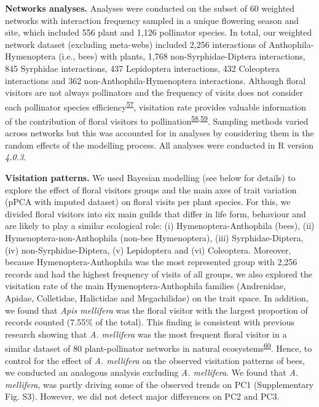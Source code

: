 \documentclass[12pt,a4paper,]{article}
\begin{document}
\textbf{Networks analyses.} Analyses were conducted on the subset of 60
weighted networks with interaction frequency sampled in a unique
flowering season and site, which included 556 plant and 1,126 pollinator
species. In total, our weighted network dataset (excluding meta-webs)
included 2,256 interactions of Anthophila-Hymenoptera (i.e., bees) with
plants, 1,768 non-Syrphidae-Diptera interactions, 845 Syrphidae
interactions, 437 Lepidoptera interactions, 432 Coleoptera interactions
and 362 non-Anthophila-Hymenoptera interactions. Although floral
visitors are not always pollinators and the frequency of visits does not
consider each pollinator species
efficiency\textsuperscript{\protect\hyperlink{ref-ballantyne2015}{57}},
visitation rate provides valuable information of the contribution of
floral visitors to
pollination\textsuperscript{\protect\hyperlink{ref-vazquez2005}{58},\protect\hyperlink{ref-vazquez2012}{59}}.
Sampling methods varied across networks but this was accounted for in
analyses by considering them in the random effects of the modelling
process. All analyses were conducted in R version \emph{4.0.3}.

\textbf{Visitation patterns.} We used Bayesian modelling (see below for
details) to explore the effect of floral visitors groups and the main
axes of trait variation (pPCA with imputed dataset) on floral visits per
plant species. For this, we divided floral visitors into six main guilds
that differ in life form, behaviour and are likely to play a similar
ecological role: (i) Hymenoptera-Anthophila (bees), (ii)
Hymenoptera-non-Anthophila (non-bee Hymenoptera), (iii)
Syrphidae-Diptera, (iv) non-Syrphidae-Diptera, (v) Lepidoptera and (vi)
Coleoptera. Moreover, because Hymenoptera-Anthophila was the most
represented group with 2,256 records and had the highest frequency of
visits of all groups, we also explored the visitation rate of the main
Hymenoptera-Anthophila families (Andrenidae, Apidae, Colletidae,
Halictidae and Megachilidae) on the trait space. In addition, we found
that \emph{Apis mellifera} was the floral visitor with the largest
proportion of records counted (7.55\% of the total). This finding is
consistent with previous research showing that \emph{A. mellifera} was
the most frequent floral visitor in a similar dataset of 80
plant-pollinator networks in natural
ecosystems\textsuperscript{\protect\hyperlink{ref-hung2018}{60}}. Hence,
to control for the effect of \emph{A. mellifera} on the observed
visitation patterns of bees, we conducted an analogous analysis
excluding \emph{A. mellifera}. We found that \emph{A. mellifera}, was
partly driving some of the observed trends on PC1 (Supplementary Fig.
S3). However, we did not detect major differences on PC2 and PC3.
\end{document}
